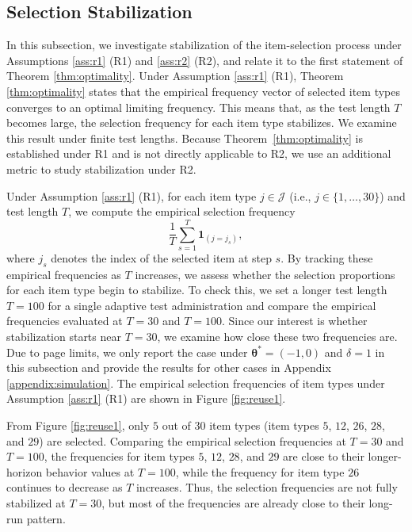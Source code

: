 \documentclass[12pt]{article}
\newcommand{\bftheta}{\boldsymbol{\theta}}
\begin{document}
\subsection{Selection Stabilization} \label{sub:stabilization}
In this subsection, we investigate stabilization of the item-selection process under Assumptions \ref{ass:r1} (R1) and \ref{ass:r2} (R2), and relate it to the first statement of Theorem \ref{thm:optimality}. Under Assumption \ref{ass:r1} (R1), Theorem \ref{thm:optimality} states that the empirical frequency vector of selected item types converges to an optimal limiting frequency. This means that, as the test length $T$ becomes large, the selection frequency for each item type stabilizes. We examine this result under finite test lengths. Because Theorem~\ref{thm:optimality} is established under R1 and is not directly applicable to R2, we use an additional metric to study stabilization under R2.

Under Assumption \ref{ass:r1} (R1), for each item type $j \in \mathcal{J}$ (i.e., $j \in \{1,\ldots,30\}$) and test length $T$, we compute the empirical selection frequency
\begin{equation*}
\frac{1}{T} \sum_{s=1}^{T} \mathbf{1}_{(j = j_s)},
\end{equation*}
where $j_s$ denotes the index of the selected item at step $s$. By tracking these empirical frequencies as $T$ increases, we assess whether the selection proportions for each item type begin to stabilize. To check this, we set a longer test length $T = 100$ for a single adaptive test administration and compare the empirical frequencies evaluated at $T = 30$ and $T = 100$. Since our interest is whether stabilization starts near $T = 30$, we examine how close these two frequencies are. Due to page limits, we only report the case under $\bftheta^{\ast} = (-1,0)$ and $\delta = 1$ in this subsection and provide the results for other cases in Appendix \ref{appendix:simulation}. The empirical selection frequencies of item types under Assumption \ref{ass:r1} (R1) are shown in Figure \ref{fig:reuse1}.

From Figure \ref{fig:reuse1}, only $5$ out of $30$ item types (item types $5$, $12$, $26$, $28$, and $29$) are selected. Comparing the empirical selection frequencies at $T = 30$ and $T = 100$, the frequencies for item types $5$, $12$, $28$, and $29$ are close to their longer-horizon behavior values at $T = 100$, while the frequency for item type $26$ continues to decrease as $T$ increases. Thus, the selection frequencies are not fully stabilized at $T = 30$, but most of the frequencies are already close to their long-run pattern.
\end{document}
